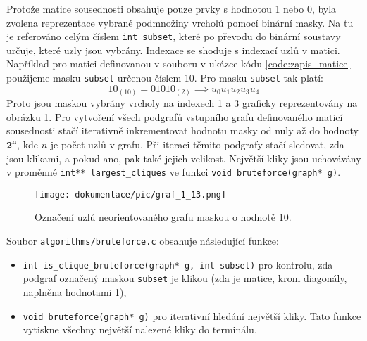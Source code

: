 \documentclass[a4paper]{article}
\begin{document}
        \noindent
        Protože matice sousednosti obsahuje pouze prvky s hodnotou 1 nebo 0, byla zvolena reprezentace vybrané podmnožiny vrcholů pomocí binární masky. Na tu je referováno celým číslem \lstinline{int subset}, které po převodu do binární soustavy určuje, které uzly jsou vybrány. Indexace se shoduje s indexací uzlů v matici.\\

        Například pro matici definovanou v souboru v ukázce kódu \ref{code:zapis_matice} použijeme masku \lstinline{subset} určenou číslem 10. Pro masku \lstinline{subset} tak platí:
        \begin{equation}
            10_{(10)} = 01010_{(2)} \implies u_{0}u_{1}u_{2}u_{3}u_{4}
        \end{equation}
        \noindent
        Proto jsou maskou vybrány vrcholy na indexech 1 a 3 graficky reprezentovány na obrázku \ref{fig:graf_maska}. Pro vytvoření všech podgrafů vstupního grafu definovaného maticí sousednosti stačí iterativně inkrementovat hodnotu masky od nuly až do hodnoty $\mathbf{2^{n}}$, kde $n$ je počet uzlů v grafu. Při iteraci těmito podgrafy stačí sledovat, zda jsou klikami, a pokud ano, pak také jejich velikost. Největší kliky jsou uchovávány v proměnné \lstinline{int** largest_cliques} ve funkci \lstinline{void bruteforce(graph* g)}.\\
        
        \begin{figure}[th]
            \centering
            \texttt{[image: dokumentace/pic/graf\_1\_13.png]}
            \caption{Označení uzlů neorientovaného grafu maskou o hodnotě 10.}
            \label{fig:graf_maska}
        \end{figure}

        \noindent
        Soubor \lstinline{algorithms/bruteforce.c} obsahuje následující funkce:
        \begin{itemize}
            \item \lstinline{int is_clique_bruteforce(graph* g, int subset)} pro kontrolu, zda podgraf označený maskou \lstinline{subset} je klikou (zda je matice, krom diagonály, naplněna hodnotami 1),
            \item \lstinline{void bruteforce(graph* g)} pro iterativní hledání největší kliky. Tato funkce vytiskne všechny největší nalezené kliky do terminálu.
        \end{itemize}
\end{document}
